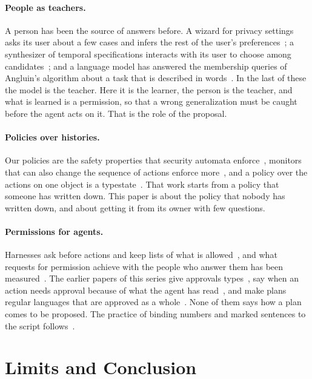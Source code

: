 \documentclass[acmsmall,nonacm,screen]{acmart}
\begin{document}
\paragraph{People as teachers.} A person has been the source of answers before. A wizard
for privacy settings asks its user about a few cases and infers the rest of the user's
preferences~\cite{fang2010}; a synthesizer of temporal specifications interacts with its user
to choose among candidates~\cite{gavran2020}; and a language model has answered the
membership queries of Angluin's algorithm about a task that is described in
words~\cite{vazquezchanlatte2024}. In the last of these the model is the teacher. Here it is
the learner, the person is the teacher, and what is learned is a permission, so that a wrong
generalization must be caught before the agent acts on it. That is the role of the
proposal.

\paragraph{Policies over histories.} Our policies are the safety properties that security
automata enforce~\cite{schneider2000}, monitors that can also change the sequence of actions
enforce more~\cite{ligatti2005}, and a policy over the actions on one object is a
typestate~\cite{strom1986}. That work starts from a policy that someone has written down.
This paper is about the policy that nobody has written down, and about getting it from its
owner with few questions.

\paragraph{Permissions for agents.} Harnesses ask before actions and keep lists of what is
allowed~\cite{claudecodepermissions}, and what requests for permission achieve with the
people who answer them has been measured~\cite{felt2012}. The earlier papers of this series
give approvals types~\cite{tpp4}, say when an action needs approval because of what the
agent has read~\cite{tpp7}, and make plans regular languages that are approved as a
whole~\cite{tpp11}. None of them says how a plan comes to be proposed. The practice of
binding numbers and marked sentences to the script follows~\cite{tpp10}.

\section{Limits and Conclusion}
\label{sec:limits}
\end{document}
